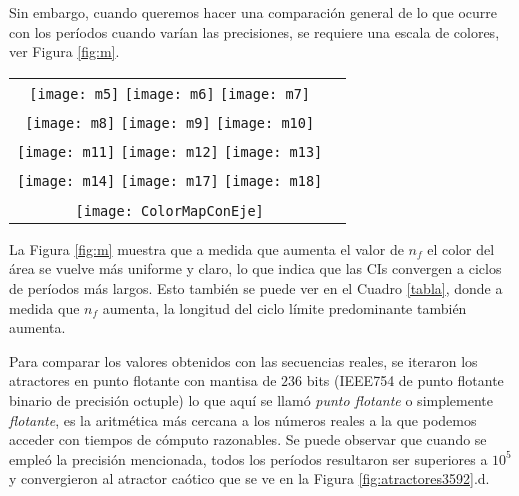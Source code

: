 Sin embargo, cuando queremos hacer una comparación general de lo que ocurre con los períodos cuando varían las precisiones, se requiere una escala de colores, ver Figura \ref{fig:m}.
%
\begin{figure*}
	\centering
	\begin{tabular}{cc}
		\texttt{[image: m5]}
		\texttt{[image: m6]}
		\texttt{[image: m7]}\\
		\texttt{[image: m8]}
		\texttt{[image: m9]}
		\texttt{[image: m10]}\\
		\texttt{[image: m11]}
		\texttt{[image: m12]}
		\texttt{[image: m13]}\\
		\texttt{[image: m14]}
		\texttt{[image: m17]}
		\texttt{[image: m18]}\\
		\\   
		\texttt{[image: ColorMapConEje]}
	\end{tabular}
	\caption{Evolución de las longitudes de período de los dominios de atracción para: (a) $n_f=5$, (b) $n_f=6$, (c) $n_f=7$, (d) $n_f=8$, (e) $n_f=9$, (f) $n_f=10$, (g) $n_f=11$, (h) $n_f=12$, (i) $n_f=13$, (j) $n_f=14$, (k) $n_f=17$, (l) $n_f=18$.}
	\label{fig:m}
\end{figure*}

La Figura \ref{fig:m} muestra que a medida que aumenta el valor de $n_f$ el color del área se vuelve más uniforme y claro, lo que indica que las CIs convergen a ciclos de períodos más largos.
Esto también se puede ver en el Cuadro \ref{tabla}, donde a medida que $n_f$ aumenta, la longitud del ciclo límite predominante también aumenta.

Para comparar los valores obtenidos con las secuencias reales, se iteraron los atractores en punto flotante con mantisa de $236$ bits (IEEE754 de punto flotante binario de precisión octuple) lo que aquí se llamó \textit{punto flotante} o simplemente \textit{flotante}, es la aritmética más cercana a los números reales a la que podemos acceder con tiempos de cómputo razonables.
Se puede observar que cuando se empleó la precisión mencionada, todos los períodos resultaron ser superiores a $10 ^ 5$ y convergieron al atractor caótico que se ve en la Figura \ref{fig:atractores3592}.d.

